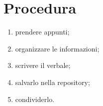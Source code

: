 \section{Procedura}

\begin{enumerate}
  \item prendere appunti;
  \item organizzare le informazioni;
  \item scrivere il verbale;
  \item salvarlo nella repository;
  \item condividerlo.
\end{enumerate}